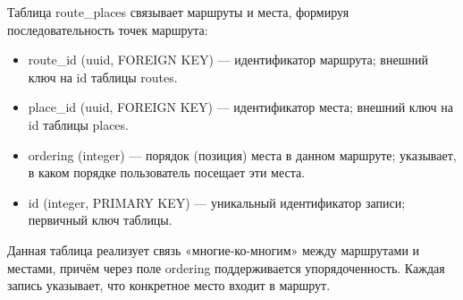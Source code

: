 \noindent Таблица route\_places связывает маршруты и места, формируя последовательность точек маршрута:
\begin{itemize}
    \item route\_id (uuid, FOREIGN KEY) — идентификатор маршрута; внешний ключ на id таблицы routes.
    \item place\_id (uuid, FOREIGN KEY) — идентификатор места; внешний ключ на id таблицы places.
    \item ordering (integer) — порядок (позиция) места в данном маршруте; указывает, в каком порядке пользователь посещает эти места.
    \item id (integer, PRIMARY KEY) — уникальный идентификатор записи; первичный ключ таблицы.
\end{itemize}
\noindent Данная таблица реализует связь «многие-ко-многим» между маршрутами и местами, причём через поле ordering поддерживается упорядоченность. Каждая запись указывает, что конкретное место входит в маршрут.

